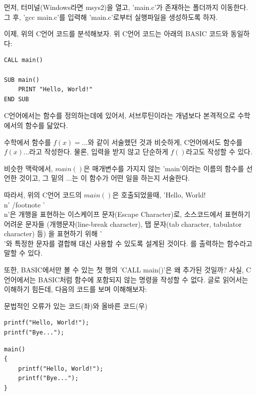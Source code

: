 \documentclass{article}
\begin{document}
먼저, 터미널(Windows라면 msys2)을 열고,
'main.c'가 존재하는 폴더까지 이동한다.
그 후, 'gcc main.c'를 입력해 'main.c'로부터 실행파일을 생성하도록 하자.

이제, 위의 C언어 코드를 분석해보자.
위 C언어 코드는 아래의 BASIC 코드와 동일하다:

\begin{lstlisting}
CALL main()

SUB main()
    PRINT "Hello, World!"
END SUB
\end{lstlisting}

C언어에서는 함수를 정의하는데에 있어서,
서브루틴이라는 개념보다 본격적으로 수학에서의 함수를 닮았다.

수학에서 함수를 $f(x) = ...$와 같이 서술했던 것과 비슷하게,
C언어에서도 함수를 $f(x) { ... }$라고 작성한다.
물론, 입력을 받지 않고 단순하게 $f()$라고도 작성할 수 있다.

비슷한 맥락에서, $main()$은 매개변수를 가지지 않는 'main'이라는 이름의 함수를 선언한 것이고,
그 밑의 ${ ... }$는 이 함수가 어떤 일을 하는지 서술한다.

따라서, 위의 C언어 코드의 $main()$은 호출되었을때,
'Hello, World!\\n'
/footnote{
    '\\n'은 개행을 표현하는 이스케이프 문자(Escape Character)로,
    소스코드에서 표현하기 어려운 문자들
    (개행문자(line-break character), 탭 문자(tab character, tabulator character) 등)
    을 표현하기 위해 '\\'와 특정한 문자를 결합해 대신 사용할 수 있도록 설계된 것이다.
}
를 출력하는 함수라고 말할 수 있다.

또한, BASIC에서만 볼 수 있는 첫 행의 'CALL main()'은 왜 추가된 것일까?
사실, C언어에서는 BASIC처럼 함수에 포함되지 않는 명령을 작성할 수 없다.
글로 읽어서는 이해하기 힘든데, 다음의 코드를 보며 이해해보자:

\begin{center}

    \centering
    
    문법적인 오류가 있는 코드(좌)와 올바른 코드(우)

    \begin{minipage}{0.45\textwidth}
        \begin{lstlisting}
printf("Hello, World!");
printf("Bye...");
        \end{lstlisting}
    \end{minipage}
    \hfill
    \begin{minipage}{0.45\textwidth}
        \begin{lstlisting}
main()
{
    printf("Hello, World!");
    printf("Bye...");
}
        \end{lstlisting}
    \end{minipage}

\end{center}
\end{document}
